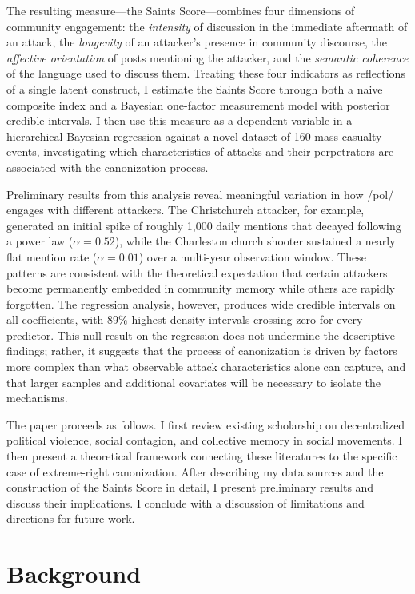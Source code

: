 \documentclass[12pt]{article}
\begin{document}
The resulting measure---the Saints Score---combines four dimensions of community engagement: the \textit{intensity} of discussion in the immediate aftermath of an attack, the \textit{longevity} of an attacker's presence in community discourse, the \textit{affective orientation} of posts mentioning the attacker, and the \textit{semantic coherence} of the language used to discuss them. Treating these four indicators as reflections of a single latent construct, I estimate the Saints Score through both a naive composite index and a Bayesian one-factor measurement model with posterior credible intervals. I then use this measure as a dependent variable in a hierarchical Bayesian regression against a novel dataset of 160 mass-casualty events, investigating which characteristics of attacks and their perpetrators are associated with the canonization process.

Preliminary results from this analysis reveal meaningful variation in how /pol/ engages with different attackers. The Christchurch attacker, for example, generated an initial spike of roughly 1,000 daily mentions that decayed following a power law ($\alpha = 0.52$), while the Charleston church shooter sustained a nearly flat mention rate ($\alpha = 0.01$) over a multi-year observation window. These patterns are consistent with the theoretical expectation that certain attackers become permanently embedded in community memory while others are rapidly forgotten. The regression analysis, however, produces wide credible intervals on all coefficients, with 89\% highest density intervals crossing zero for every predictor. This null result on the regression does not undermine the descriptive findings; rather, it suggests that the process of canonization is driven by factors more complex than what observable attack characteristics alone can capture, and that larger samples and additional covariates will be necessary to isolate the mechanisms.

The paper proceeds as follows. I first review existing scholarship on decentralized political violence, social contagion, and collective memory in social movements. I then present a theoretical framework connecting these literatures to the specific case of extreme-right canonization. After describing my data sources and the construction of the Saints Score in detail, I present preliminary results and discuss their implications. I conclude with a discussion of limitations and directions for future work.

\section{Background}
\end{document}
